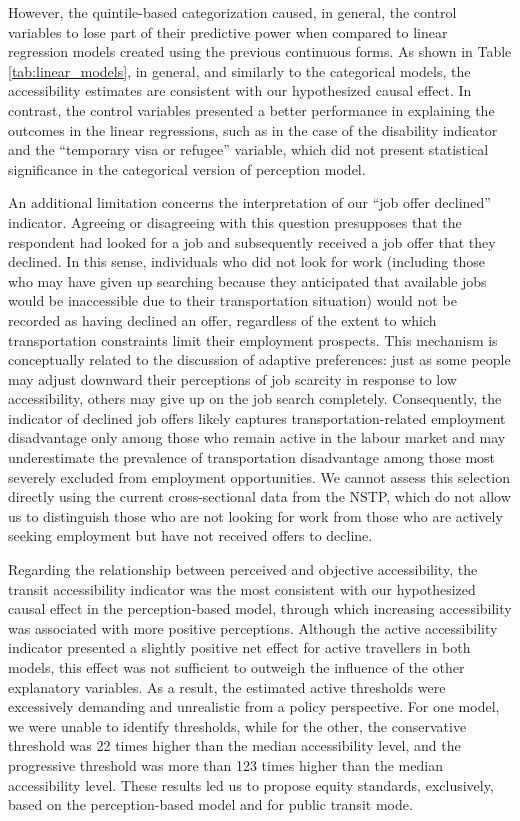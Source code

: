 \documentclass[preprint, 3p,
authoryear]{elsarticle} %
\begin{document}
However, the quintile-based categorization caused, in general, the
control variables to lose part of their predictive power when compared
to linear regression models created using the previous continuous forms.
As shown in Table \ref{tab:linear_models}, in general, and similarly to
the categorical models, the accessibility estimates are consistent with
our hypothesized causal effect. In contrast, the control variables
presented a better performance in explaining the outcomes in the linear
regressions, such as in the case of the disability indicator and the
``temporary visa or refugee'' variable, which did not present
statistical significance in the categorical version of perception model.

An additional limitation concerns the interpretation of our ``job offer
declined'' indicator. Agreeing or disagreeing with this question
presupposes that the respondent had looked for a job and subsequently
received a job offer that they declined. In this sense, individuals who
did not look for work (including those who may have given up searching
because they anticipated that available jobs would be inaccessible due
to their transportation situation) would not be recorded as having
declined an offer, regardless of the extent to which transportation
constraints limit their employment prospects. This mechanism is
conceptually related to the discussion of adaptive preferences: just as
some people may adjust downward their perceptions of job scarcity in
response to low accessibility, others may give up on the job search
completely. Consequently, the indicator of declined job offers likely
captures transportation-related employment disadvantage only among those
who remain active in the labour market and may underestimate the
prevalence of transportation disadvantage among those most severely
excluded from employment opportunities. We cannot assess this selection
directly using the current cross-sectional data from the NSTP, which do
not allow us to distinguish those who are not looking for work from
those who are actively seeking employment but have not received offers
to decline.

Regarding the relationship between perceived and objective
accessibility, the transit accessibility indicator was the most
consistent with our hypothesized causal effect in the perception-based
model, through which increasing accessibility was associated with more
positive perceptions. Although the active accessibility indicator
presented a slightly positive net effect for active travellers in both
models, this effect was not sufficient to outweigh the influence of the
other explanatory variables. As a result, the estimated active
thresholds were excessively demanding and unrealistic from a policy
perspective. For one model, we were unable to identify thresholds, while
for the other, the conservative threshold was 22 times higher than the
median accessibility level, and the progressive threshold was more than
123 times higher than the median accessibility level. These results led
us to propose equity standards, exclusively, based on the
perception-based model and for public transit mode.
\end{document}
